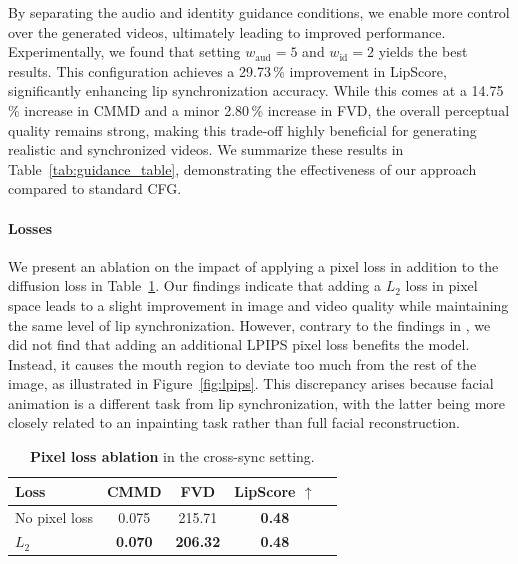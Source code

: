 By separating the audio and identity guidance conditions, we enable more control over the generated videos, ultimately leading to improved performance. Experimentally, we found that setting $w_{\text{aud}}=5$ and $w_{\text{id}}=2$ yields the best results. This configuration achieves a 29.73\,\% improvement in LipScore, significantly enhancing lip synchronization accuracy. While this comes at a 14.75\,\% increase in CMMD and a minor 2.80\,\% increase in FVD, the overall perceptual quality remains strong, making this trade-off highly beneficial for generating realistic and synchronized videos. We summarize these results in Table~\ref{tab:guidance_table}, demonstrating the effectiveness of our approach compared to standard CFG.

\begin{table}[ht]
\centering
{}
\caption{\textbf{Guidance ablation} in the cross-sync setting.}
\label{tab:guidance_table}
\end{table}

\paragraph{Losses}

We present an ablation on the impact of applying a pixel loss in addition to the diffusion loss in Table~\ref{tab:pixel_table}. Our findings indicate that adding a $L_2$ loss in pixel space leads to a slight improvement in image and video quality while maintaining the same level of lip synchronization. However, contrary to the findings in \cite{keyface}, we did not find that adding an additional LPIPS pixel loss benefits the model. Instead, it causes the mouth region to deviate too much from the rest of the image, as illustrated in Figure~\ref{fig:lpips}. This discrepancy arises because facial animation is a different task from lip synchronization, with the latter being more closely related to an inpainting task rather than full facial reconstruction.

\begin{table}[ht]
\centering
\begin{tabular}{lcccc}
\toprule
Loss     &        CMMD & FVD & LipScore $\uparrow$  \\ \midrule
No pixel loss      &  0.075  &  215.71   & \textbf{0.48}  \\
\rowcolor{Gray!40} $L_2$  & \textbf{0.070} & \textbf{206.32} & \textbf{0.48}  \\
\bottomrule
\end{tabular}
\caption{\textbf{Pixel loss ablation} in the cross-sync setting.}
\label{tab:pixel_table}
\end{table}


